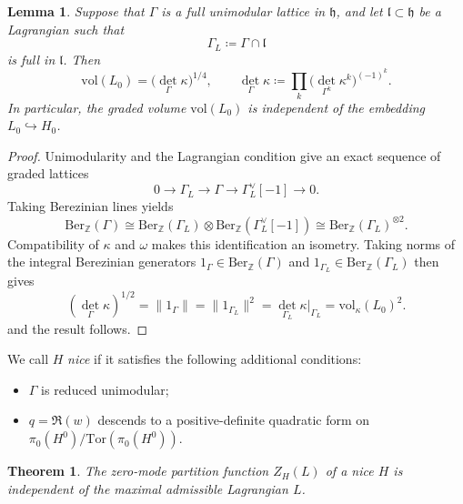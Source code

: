 \documentclass[10pt,a4paper]{amsart}
\numberwithin{table}{section}
\numberwithin{equation}{section}
\newtheorem{lem}{Lemma}[section]
\newtheorem{thm}{Theorem}[section]
\newcommand{\fh}{\mathfrak{h}}
\newcommand{\fl}{\mathfrak{l}}
\newcommand{\Z}{\mathbb{Z}}
\newcommand{\Tor}{\mathrm{Tor}}
\newcommand{\vol}{\mathrm{vol}}
\newcommand{\Ber}{\mathrm{Ber}}
\begin{document}
\begin{lem}\label{lem:unimodular-volume}
Suppose that $\Gamma$ is a full unimodular lattice in $\fh$, and let $\fl\subset\fh$ be a Lagrangian such that 
\[
\Gamma_L\coloneq\Gamma\cap\fl
\]
is full in $\fl$. Then
\[
\vol(L_0)=\bigl({\det}_\Gamma \kappa \bigr)^{1/4},
\qquad
{\det}_\Gamma \kappa \coloneq\prod_k\bigl({\det}_{\Gamma^k}\kappa^k\bigr)^{(-1)^k}.
\]
In particular, the graded volume $\vol(L_0)$ is independent of the embedding $L_0\hookrightarrow H_0$.
\end{lem}

\begin{proof}
Unimodularity and the Lagrangian condition give an exact sequence of graded lattices
\[
0\longrightarrow\Gamma_L\longrightarrow\Gamma
\longrightarrow\Gamma_L^\vee[-1]\longrightarrow0.
\]
Taking Berezinian lines yields
\[
\Ber_\Z(\Gamma)\cong
\Ber_\Z(\Gamma_L)\otimes\Ber_\Z(\Gamma_L^\vee[-1])
\cong\Ber_\Z(\Gamma_L)^{\otimes2}.
\]
Compatibility of $\kappa$ and $\omega$ makes this identification an isometry. Taking norms of the integral Berezinian generators $1_\Gamma \in \Ber_\Z(\Gamma)$ and $1_{\Gamma_L} \in \Ber_\Z(\Gamma_L)$ then gives
\[
({\det}_{\Gamma}\kappa)^{1/2}
=\lVert 1_{\Gamma}\rVert
=\lVert 1_{\Gamma_L}\rVert^2
={\det}_{\Gamma_L}\kappa|_{\Gamma_L}
=\vol_{\kappa}(L_0)^2.
\]
and the result follows.
\end{proof}

We call $H$ \emph{nice} if it satisfies the following additional conditions:
\begin{itemize}
	\item $\Gamma$ is reduced unimodular;
	\item $q=\Re(w)$ descends to a positive-definite quadratic form on $\pi_0(H^0)/\Tor(\pi_0(H^0))$.
\end{itemize}


\begin{thm}\label{thm:L-independence}
The zero-mode partition function $Z_H(L)$ of a nice $H$ is independent of the maximal admissible Lagrangian $L$.
\end{thm}
\end{document}
